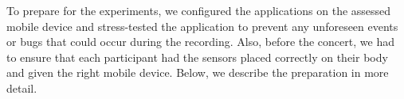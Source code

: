 \begin{table}
\begin{center}
\caption{Device models used during the concert}
\end{center}
\end{table}

To prepare for the experiments, we configured the applications on the assessed mobile device and stress-tested the application to prevent any unforeseen events or bugs that could occur during the recording. Also, before the concert, we had to ensure that each participant had the sensors placed correctly on their body and given the right mobile device. Below, we describe the preparation in more detail.

